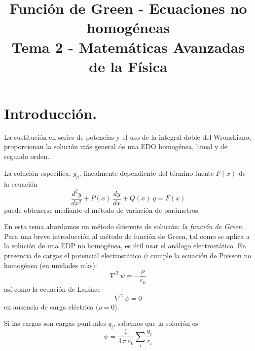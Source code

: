 

\title{Función de Green - Ecuaciones no homogéneas \\ \large {Tema 2 - Matemáticas Avanzadas de la Física}}
\date{}

\renewcommand\labelenumii{\theenumi.{\arabic{enumii}}}
\maketitle
\fontsize{14}{14}\selectfont
\section{Introducción.}
La sustitución en series de potencias y el uso de la integral doble del Wronskiano, proporcionan la solución más general de una EDO homogénea, lineal y de segundo orden. 
\par
La solución específica, $y_{p}$, linealmente dependiente del término fuente $F (x)$ de la ecuación
\begin{equation}
\dfrac{d^{2} y}{d x^{2}} +  P(x) \: \dfrac{d y}{d x} + Q(x) \: y = F(x)
\label{eq:ecuacion_09_82}
\end{equation}
puede obtenerse mediante el método de variación de parámetros.
\par
En esta tema abordamos un método diferente de solución: \emph{la función de Green}. Para una breve introducción al método de función de Green, tal como se aplica a la solución de una EDP no homogénea, es útil usar el análogo electrostático. En presencia de cargas el potencial electrostático $\psi$ cumple la ecuación de Poisson no homogénea (en unidades mks):
\begin{equation}
\nabla^{2} \: \psi = - \dfrac{\rho}{\varepsilon_{0}}
\label{eq:ecuacion_09_143}
\end{equation}
así como la ecuación de Laplace
\begin{equation}
\nabla^{2} \: \psi = 0
\label{eq:ecuacion_09_144}
\end{equation}
en ausencia de carga eléctrica ($\rho = 0$).
\par
Si las cargas son cargas puntuales $q_{i}$, sabemos que la solución es
\begin{equation}
\psi = \dfrac{1}{4 \, \pi \, \varepsilon_{0}} \sum_{i} \dfrac{q_{i}}{r_{i}}
\label{eq:ecuacion_09_145}
\end{equation}

